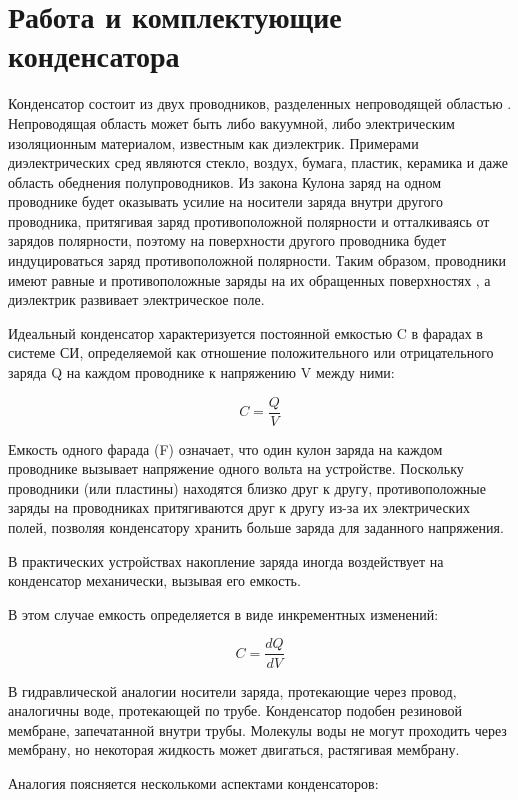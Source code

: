 \chapter{Работа и комплектующие конденсатора}

Конденсатор состоит из двух проводников, разделенных непроводящей областью \cite{GUSEV}. Непроводящая область может быть либо вакуумной, либо электрическим изоляционным материалом, известным как диэлектрик. Примерами диэлектрических сред являются стекло, воздух, бумага, пластик, керамика и даже область обеднения полупроводников. Из закона Кулона заряд на одном проводнике будет оказывать усилие на носители заряда внутри другого проводника, притягивая заряд противоположной полярности и отталкиваясь от зарядов полярности, поэтому на поверхности другого проводника будет индуцироваться заряд противоположной полярности. Таким образом, проводники имеют равные и противоположные заряды на их обращенных поверхностях \cite{GUSEV}, а диэлектрик развивает электрическое поле.

Идеальный конденсатор характеризуется постоянной емкостью C в фарадах в системе СИ, определяемой как отношение положительного или отрицательного заряда Q на каждом проводнике к напряжению V между ними: \cite{DYAK}

\[
C=\frac{Q}{V}
\]

Емкость одного фарада (F) означает, что один кулон заряда на каждом проводнике вызывает напряжение одного вольта на устройстве. \cite{DYAK} Поскольку проводники (или пластины) находятся близко друг к другу, противоположные заряды на проводниках притягиваются друг к другу из-за их электрических полей, позволяя конденсатору хранить больше заряда для заданного напряжения.

В практических устройствах накопление заряда иногда воздействует на конденсатор механически, вызывая его емкость. 

В этом случае емкость определяется в виде инкрементных изменений:

\[
C=\frac{dQ}{dV}
\]

В гидравлической аналогии носители заряда, протекающие через провод, аналогичны воде, протекающей по трубе. Конденсатор подобен резиновой мембране, запечатанной внутри трубы. Молекулы воды не могут проходить через мембрану, но некоторая жидкость может двигаться, растягивая мембрану. 

Аналогия поясняется несколькоми аспектами конденсаторов:

